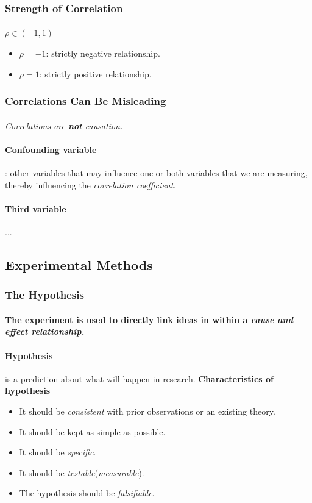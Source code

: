 \documentclass{article}
\begin{document}
 	\subsubsection{Strength of Correlation}
 	\paragraph{}$\rho \in (-1,1)$
 	\begin{itemize}
 		\item \textbf{$\rho = -1$}: strictly negative relationship.
 		\item \textbf{$\rho = 1$}: strictly positive relationship.
 	\end{itemize}
 	\subsubsection{Correlations Can Be Misleading}
 	\paragraph{}\emph{Correlations are \textbf{not} causation.}
 	\paragraph{Confounding variable}: other variables that may influence one or both variables that we are measuring, thereby influencing the \emph{correlation coefficient}.
 	\paragraph{Third variable}...
 	\subsection{Experimental Methods}
 	\subsubsection{The Hypothesis}
 	\paragraph{} \textbf{The experiment is used to directly link ideas in within a \emph{cause and effect relationship.}}
 	\paragraph{Hypothesis} is a prediction about what will happen in research.
 	\newline \textbf{Characteristics of hypothesis}
 	\begin{itemize}
 		\item It should be \emph{consistent} with prior observations or an existing theory.
 		\item It should be kept as simple as possible.
 		\item It should be \emph{specific}.
 		\item It should be \emph{testable}(\emph{measurable}).
 		\item The hypothesis should be \emph{falsifiable}.
 	\end{itemize}
\end{document}
